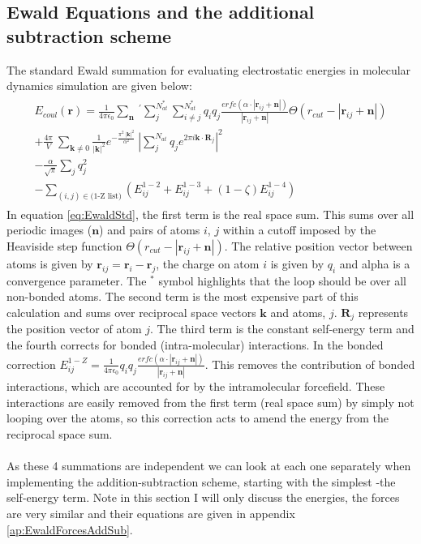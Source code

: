 \subsection{Ewald Equations and the additional subtraction scheme}
The standard Ewald summation for evaluating electrostatic energies in molecular dynamics simulation are given below:
\begin{align}
  \begin{split}
E_{coul}\left(\mathbf{r}\right)
=
	  \frac{1}{4 \pi \epsilon_0} \sum_{\mathbf{n}} \ ^{'} \sum_{j}^{N_{at}^{*}} \sum_{i \neq j}^{N_{at}^{*}} q_i q_j \frac{erfc\left( \alpha \cdot |\mathbf{r}_{ij} + \mathbf{n}|\right)}{|\mathbf{r}_{ij} + \mathbf{n}|} \Theta\left( r_{cut} - |\mathbf{r}_{ij} + \mathbf{n}| \right)
\\
+
\frac{4 \pi}{ V} \ \sum_{\mathbf{k} \neq 0} \frac{1}{|\mathbf{k}|^2} e^{-\frac{\pi^2 \ |\mathbf{k}|^2}{\alpha^2}} \ \left|\sum_{j}^{N_{at}} q_{j} e^{2\pi i \mathbf{k} \cdot \mathbf{R}_{j}}\right|^2 \\
- \frac{\alpha}{\sqrt{\pi}} \sum_{j} q_{j}^2
\\
	  - \sum_{(i,j) \in (\text{1-Z list)}}\left(E^{1-2}_{ij} + E^{1-3}_{ij} + (1 - \zeta)E_{ij}^{1-4} \right)
	\end{split}
\label{eq:EwaldStd}
\end{align}
In equation \eqref{eq:EwaldStd}, the first term is the real space sum. This sums over all periodic images ($\mathbf{n}$) and pairs of atoms $i$, $j$ within a cutoff imposed by the Heaviside step function $\Theta(r_{cut} - |\mathbf{r}_{ij}+\mathbf{n}|)$. The relative position vector between atoms is given by $\mathbf{r}_{ij} = \mathbf{r}_{i} - \mathbf{r}_{j}$, the charge on atom $i$ is given by $q_{i}$ and alpha is a convergence parameter. The $^{*}$ symbol highlights that the loop should be over all non-bonded atoms. The second term is the most expensive part of this calculation and sums over reciprocal space vectors $\mathbf{k}$ and atoms, $j$. $\mathbf{R}_{j}$ represents the position vector of atom $j$. The third term is the constant self-energy term and the fourth corrects for bonded (intra-molecular) interactions. In the bonded correction $E_{ij}^{1-Z} = \frac{1}{4 \pi \epsilon_{0}} q_{i}q_{j} \frac{erfc\left( \alpha \cdot |\mathbf{r}_{ij} + \mathbf{n}|\right)}{|\mathbf{r}_{ij} + \mathbf{n}|}$. This removes the contribution of bonded interactions, which are accounted for by the intramolecular forcefield. These interactions are easily removed from the first term (real space sum) by simply not looping over the atoms, so this correction acts to amend the energy from the reciprocal space sum.
\\\\
As these 4 summations are independent we can look at each one separately when implementing the addition-subtraction scheme, starting with the simplest -the self-energy term. Note in this section I will only discuss the energies, the forces are very similar and their equations are given in appendix \ref{ap:EwaldForcesAddSub}.
